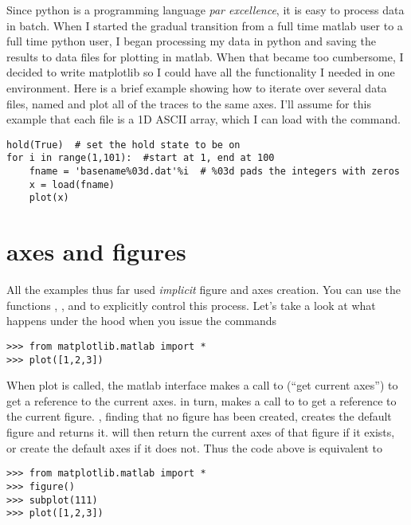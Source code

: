 \documentclass[twoside]{book}
\begin{document}
Since python is a programming language \textit{par excellence}, it is
easy to process data in batch.  When I started the gradual transition
from a full time matlab user to a full time python user, I began
processing my data in python and saving the results to data files for
plotting in matlab.  When that became too cumbersome, I decided to
write matplotlib so I could have all the functionality I needed in one
environment.  Here is a brief example showing how to iterate over
several data files, named  and plot all of the traces to
the same axes.  I'll assume for this example that each file is a 1D
ASCII array, which I can load with the  command.

\begin{lstlisting}
hold(True)  # set the hold state to be on
for i in range(1,101):  #start at 1, end at 100
    fname = 'basename%03d.dat'%i  # %03d pads the integers with zeros
    x = load(fname)
    plot(x)
\end{lstlisting}


\section{axes and figures}
\label{sec:axes_and_figures}
All the examples thus far used \textit{implicit} figure and axes
creation.  You can use the functions , ,
and  to explicitly control this process.  Let's take a look
at what happens under the hood when you issue the commands

\begin{lstlisting}
>>> from matplotlib.matlab import *
>>> plot([1,2,3])
\end{lstlisting}

When plot is called, the matlab interface makes a call to 
(``get current axes'') to get a reference to the current axes.
 in turn, makes a call to  to get a reference to
the current figure.  , finding that no figure has been
created, creates the default figure  and returns it.
 will then return the current axes of that figure if it
exists, or create the default axes  if it does
not.  Thus the code above is equivalent to 

\begin{lstlisting}
>>> from matplotlib.matlab import *
>>> figure()
>>> subplot(111)
>>> plot([1,2,3])
\end{lstlisting}
\end{document}
